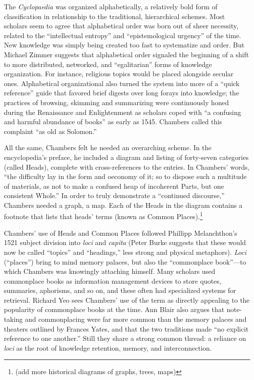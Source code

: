 The \emph{Cyclopaedia} was organized alphabetically, a relatively bold form of classification in relationship to the traditional, hierarchical schemes. Most scholars seem to agree that alphabetical order was born out of sheer necessity, related to the ``intellectual entropy'' and ``epistemological urgency'' of the time.\autocite[5]{rosenberg_early_2003} New knowledge was simply being created too fast to systematize and order. But Michael Zimmer suggests that alphabetical order signaled the beginning of a shift to more distributed, networked, and ``egalitarian'' forms of knowledge organization.\autocite[100]{zimmer_renvois_2009} For instance, religious topics would be placed alongside secular ones. Alphabetical organizational also turned the system into more of a ``quick reference'' guide that favored brief digests over long forays into knowledge; the practices of browsing, skimming and summarizing were continuously honed during the Renaissance and Enlightenment as scholars coped with ``a confusing and harmful abundance of books'' as early as 1545.\autocite{blair_reading_2003} Chambers called this complaint ``as old as Solomon.''\autocite[11]{yeo_solution_2003}

All the same, Chambers felt he needed an overarching scheme. In the encyclopedia's preface, he included a diagram and listing of forty-seven categories (called Heads), complete with cross-references to the entries. In Chambers' words, ``the difficulty lay in the form and oeconomy of it; so to dispose such a multitude of materials, as not to make a confused heap of incoherent Parts, but one consistent Whole.''\autocite[67]{yeo_solution_2003} In order to truly demonstrate a ``continued discourse,'' Chambers needed a graph, a map. Each of the Heads in the diagram contains a footnote that lists that heads' terms (known as Common Places).\footnote{(add more historical diagrams of graphs, trees, maps)}

Chambers' use of Heads and Common Places followed Phillipp Melanchthon's 1521 subject division into \emph{loci} and \emph{capita} (Peter Burke suggests that these would now be called ``topics'' and ``headings,'' less strong and physical metaphors).\autocite[95]{burke_social_2000} \emph{Loci} (``places'') bring to mind memory palaces, but also the ``commonplace book''---to which Chambers was knowingly attaching himself. Many scholars used commonplace books as information management devices to store quotes, summaries, aphorisms, and so on, and these often had specialized systems for retrieval. Richard Yeo sees Chambers' use of the term as directly appealing to the popularity of commonplace books at the time.\autocite[65-66]{yeo_solution_2003} Ann Blair also argues that note-taking and commonplacing were far more common than the memory palaces and theaters outlined by Frances Yates, and that the two traditions made ``no explicit reference to one another.''\autocite[``Note Taking as an Aid to Memory'']{blair_too_2010} Still they share a strong common thread: a reliance on \emph{loci} as the root of knowledge retention, memory, and interconnection.

